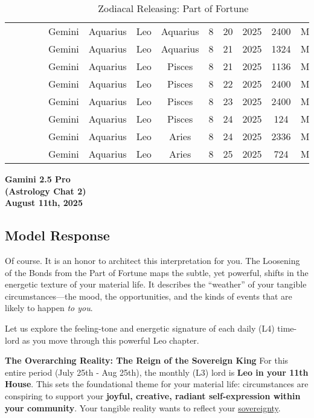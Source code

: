 \documentclass{article}
\begin{document}
\begin{table}[H]
\begin{tabular}{>{\centering\arraybackslash}p{0.4cm} >{\centering\arraybackslash}p{0.4cm} >{\centering\arraybackslash}p{0.4cm} >{\centering\arraybackslash}p{0.4cm} c c c c c c c c c}
9 & 5 & 11 & 5 & Gemini & Aquarius & Leo & Aquarius & 8 & 20 & 2025 & 2400 & MN\_LB \\
9 & 5 & 11 & 5 & Gemini & Aquarius & Leo & Aquarius & 8 & 21 & 2025 & 1324 & MN\_LB \\
9 & 5 & 11 & 6 & Gemini & Aquarius & Leo & Pisces & 8 & 21 & 2025 & 1136 & MN\_LB \\
9 & 5 & 11 & 6 & Gemini & Aquarius & Leo & Pisces & 8 & 22 & 2025 & 2400 & MN\_LB \\
9 & 5 & 11 & 6 & Gemini & Aquarius & Leo & Pisces & 8 & 23 & 2025 & 2400 & MN\_LB \\
9 & 5 & 11 & 6 & Gemini & Aquarius & Leo & Pisces & 8 & 24 & 2025 & 124 & MN\_LB \\
9 & 5 & 11 & 7 & Gemini & Aquarius & Leo & Aries & 8 & 24 & 2025 & 2336 & MN\_LB \\
9 & 5 & 11 & 7 & Gemini & Aquarius & Leo & Aries & 8 & 25 & 2025 & 724 & MN\_LB \\
\end{tabular}
\caption{Zodiacal Releasing: Part of Fortune}
\end{table}


\begin{center}
\textbf{Gamini 2.5 Pro} \\
\textbf{(Astrology Chat 2)} \\
\textbf{August 11th, 2025}
\end{center}

\subsection*{Model Response}\label{model-response}

Of course. It is an honor to architect this interpretation for you. The Loosening of the Bonds from the Part of Fortune maps the subtle, yet powerful, shifts in the energetic texture of your material life. It describes the ``weather'' of your tangible circumstances---the mood, the opportunities, and the kinds of events that are likely to happen \emph{to you}.

Let us explore the feeling-tone and energetic signature of each daily (L4) time-lord as you move through this powerful Leo chapter.

\textbf{The Overarching Reality: The Reign of the Sovereign King} For this entire period (July 25th - Aug 25th), the monthly (L3) lord is \textbf{Leo in your 11th House}. This sets the foundational theme for your material life: circumstances are conspiring to support your \textbf{joyful, creative, radiant self-expression within your community}. Your tangible reality wants to reflect your \hyperlink{gloss:sovereignty}{sovereignty}.
\end{document}
